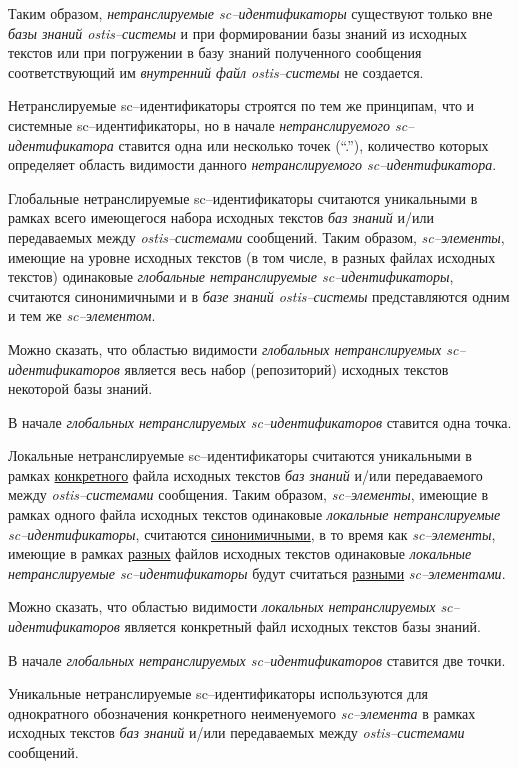 Таким образом, \textit{нетранслируемые sc--идентификаторы} существуют только вне \textit{базы знаний ostis--системы} и при формировании базы знаний из исходных текстов или при погружении в базу знаний полученного сообщения соответствующий им \textit{внутренний файл ostis--системы} не создается.

Нетранслируемые sc--идентификаторы строятся по тем же принципам, что и системные sc--идентификаторы, но в начале \textit{нетранслируемого sc--идентификатора} ставится одна или несколько точек (``.''), количество которых определяет область видимости данного \textit{нетранслируемого sc--идентификатора}.

Глобальные нетранслируемые sc--идентификаторы считаются уникальными в рамках всего имеющегося набора исходных текстов \textit{баз знаний} и/или передаваемых между \textit{ostis--системами} сообщений. Таким образом, \textit{sc--элементы}, имеющие на уровне исходных текстов (в том числе, в разных файлах исходных текстов) одинаковые \textit{глобальные нетранслируемые sc--идентификаторы}, считаются синонимичными и в \textit{базе знаний ostis--системы} представляются одним и тем же \textit{sc--элементом}.

Можно сказать, что областью видимости \textit{глобальных нетранслируемых sc--идентификаторов} является весь набор (репозиторий) исходных текстов некоторой базы знаний.

В начале \textit{глобальных нетранслируемых sc--идентификаторов} ставится одна точка.

Локальные нетранслируемые sc--идентификаторы считаются уникальными в рамках \uline{конкретного} файла исходных текстов \textit{баз знаний} и/или передаваемого между \textit{ostis--системами} сообщения. Таким образом, \textit{sc--элементы}, имеющие в рамках одного файла исходных текстов одинаковые \textit{локальные нетранслируемые sc--идентификаторы}, считаются \uline{синонимичными}, в то время как \textit{sc--элементы}, имеющие в рамках \uline{разных} файлов исходных текстов одинаковые \textit{локальные нетранслируемые sc--идентификаторы} будут считаться \uline{разными} \textit{sc--элементами}.

Можно сказать, что областью видимости \textit{локальных нетранслируемых sc--идентификаторов} является конкретный файл исходных текстов базы знаний.

В начале \textit{глобальных нетранслируемых sc--идентификаторов} ставится две точки.

Уникальные нетранслируемые sc--идентификаторы используются для однократного обозначения конкретного неименуемого \textit{sc--элемента} в рамках исходных текстов \textit{баз знаний} и/или передаваемых между \textit{ostis--системами} сообщений.

